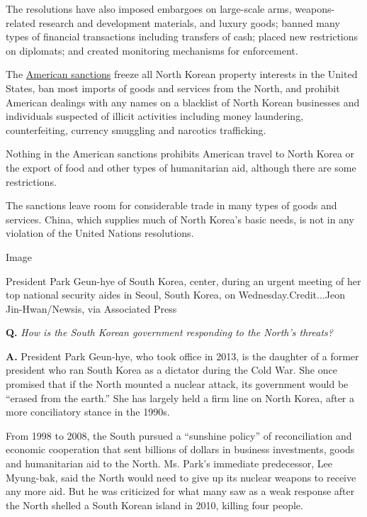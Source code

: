 The resolutions have also imposed embargoes on large-scale arms,
weapons-related research and development materials, and luxury goods;
banned many types of financial transactions including transfers of cash;
placed new restrictions on diplomats; and created monitoring mechanisms
for enforcement.

The
\href{http://www.treasury.gov/resource-center/sanctions/Programs/Documents/nkorea.txt}{American
sanctions} freeze all North Korean property interests in the United
States, ban most imports of goods and services from the North, and
prohibit American dealings with any names on a blacklist of North Korean
businesses and individuals suspected of illicit activities including
money laundering, counterfeiting, currency smuggling and narcotics
trafficking.

Nothing in the American sanctions prohibits American travel to North
Korea or the export of food and other types of humanitarian aid,
although there are some restrictions.

The sanctions leave room for considerable trade in many types of goods
and services. China, which supplies much of North Korea's basic needs,
is not in any violation of the United Nations resolutions.

Image

President Park Geun-hye of South Korea, center, during an urgent meeting
of her top national security aides in Seoul, South Korea, on
Wednesday.Credit...Jeon Jin-Hwan/Newsis, via Associated Press

\textbf{Q.} \emph{How is the South Korean government responding to the
North's threats?}

\textbf{A.} President Park Geun-hye, who took office in 2013, is the
daughter of a former president who ran South Korea as a dictator during
the Cold War. She once promised that if the North mounted a nuclear
attack, its government would be ``erased from the earth.'' She has
largely held a firm line on North Korea, after a more conciliatory
stance in the 1990s.

From 1998 to 2008, the South pursued a ``sunshine policy'' of
reconciliation and economic cooperation that sent billions of dollars in
business investments, goods and humanitarian aid to the North. Ms.
Park's immediate predecessor, Lee Myung-bak, said the North would need
to give up its nuclear weapons to receive any more aid. But he was
criticized for what many saw as a weak response after the North shelled
a South Korean island in 2010, killing four people.

